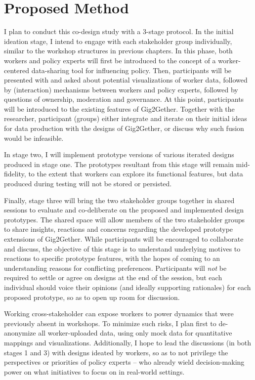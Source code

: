 \section{Proposed Method}
I plan to conduct this co-design study with a 3-stage protocol. In the initial ideation stage, I intend to engage with each stakeholder group individually, similar to the workshop structures in previous chapters. In this phase, both workers and policy experts will first be introduced to the concept of a worker-centered data-sharing tool for influencing policy. Then, participants will be presented with and asked about potential visualizations of worker data, followed by (interaction) mechanisms between workers and policy experts, followed by questions of ownership, moderation and governance. 
At this point, participants will be introduced to the existing features of Gig2Gether. Together with the researcher, participant (groups) either integrate and iterate on their initial ideas for data production with the designs of Gig2Gether, or discuss why such fusion would be infeasible.

In stage two, I will implement prototype versions of various iterated designs produced in stage one. The prototypes resultant from this stage will remain mid-fidelity, to the extent that workers can explore its functional features, but data produced during testing will not be stored or persisted.

Finally, stage three will bring the two stakeholder groups together in shared sessions to evaluate and co-deliberate on the proposed and implemented design prototypes. The shared space will allow members of the two stakeholder groups to share insights, reactions and concerns regarding the developed prototype extensions of Gig2Gether. While participants will be encouraged to collaborate and discuss, the objective of this stage is to understand underlying motives to reactions to specific prototype features, with the hopes of coming to an understanding reasons for conflicting preferences. Participants will \textit{not} be required to settle or agree on designs at the end of the session, but each individual should voice their opinions (and ideally supporting rationales) for each proposed prototype, so as to open up room for discussion.

Working cross-stakeholder can expose workers to power dynamics that were previously absent in workshops. To minimize such risks, I plan first to de-anonymize all worker-uploaded data, using only mock data for quantitative mappings and visualizations. Additionally, I hope to lead the discussions (in both stages 1 and 3) with designs ideated by workers, so as to not privilege the perspectives or priorities of policy experts -- who already wield decision-making power on what initiatives to focus on in real-world settings.


